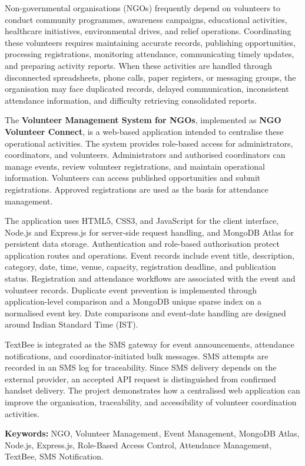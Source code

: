 \documentclass[12pt,a4paper,oneside]{report}
\newcommand{\applicationname}{NGO Volunteer Connect}
\begin{document}
Non-governmental organisations (NGOs) frequently depend on volunteers to conduct community programmes, awareness campaigns, educational activities, healthcare initiatives, environmental drives, and relief operations. Coordinating these volunteers requires maintaining accurate records, publishing opportunities, processing registrations, monitoring attendance, communicating timely updates, and preparing activity reports. When these activities are handled through disconnected spreadsheets, phone calls, paper registers, or messaging groups, the organisation may face duplicated records, delayed communication, inconsistent attendance information, and difficulty retrieving consolidated reports.

The \textbf{Volunteer Management System for NGOs}, implemented as \textbf{\applicationname}, is a web-based application intended to centralise these operational activities. The system provides role-based access for administrators, coordinators, and volunteers. Administrators and authorised coordinators can manage events, review volunteer registrations, and maintain operational information. Volunteers can access published opportunities and submit registrations. Approved registrations are used as the basis for attendance management.

The application uses HTML5, CSS3, and JavaScript for the client interface, Node.js and Express.js for server-side request handling, and MongoDB Atlas for persistent data storage. Authentication and role-based authorisation protect application routes and operations. Event records include event title, description, category, date, time, venue, capacity, registration deadline, and publication status. Registration and attendance workflows are associated with the event and volunteer records. Duplicate event prevention is implemented through application-level comparison and a MongoDB unique sparse index on a normalised event key. Date comparisons and event-date handling are designed around Indian Standard Time (IST).

TextBee is integrated as the SMS gateway for event announcements, attendance notifications, and coordinator-initiated bulk messages. SMS attempts are recorded in an SMS log for traceability. Since SMS delivery depends on the external provider, an accepted API request is distinguished from confirmed handset delivery. The project demonstrates how a centralised web application can improve the organisation, traceability, and accessibility of volunteer coordination activities.

\textbf{Keywords:} NGO, Volunteer Management, Event Management, MongoDB Atlas, Node.js, Express.js, Role-Based Access Control, Attendance Management, TextBee, SMS Notification.
\end{document}
